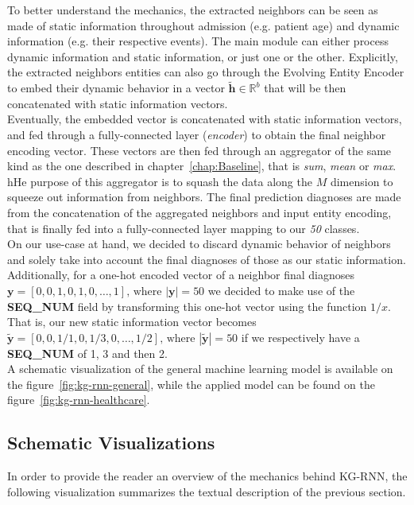 To better understand the mechanics, the extracted neighbors can be seen as made of static information throughout admission (e.g. patient age) and dynamic information (e.g. their respective events). The main module can either process dynamic information and static information, or just one or the other. Explicitly, the extracted neighbors entities can also go through the Evolving Entity Encoder to embed their dynamic behavior in a vector $\bm{\tilde{h}} \in \mathbb{R}^{b}$ that will be then concatenated with static information vectors. \\

Eventually, the embedded vector is concatenated with static information vectors, and fed through a fully-connected layer (\textit{encoder}) to obtain the final neighbor encoding vector. These vectors are then fed through an aggregator of the same kind as the one described in chapter~\ref{chap:Baseline}, that is \textit{sum}, \textit{mean} or \textit{max}. hHe purpose of this aggregator is to squash the data along the $M$ dimension to squeeze out information from neighbors. The final prediction diagnoses are made from the concatenation of the aggregated neighbors and input entity encoding, that is finally fed into a fully-connected layer mapping to our \emph{50} classes. \\

On our use-case at hand, we decided to discard dynamic behavior of neighbors and solely take into account the final diagnoses of those as our static information. Additionally, for a one-hot encoded vector of a neighbor final diagnoses $\bm{y}=[0, 0, 1, 0, 1, 0, \dots, 1]\mbox{, where }|\bm{y}|=50$ we decided to make use of the \textbf{SEQ\_NUM} field by transforming this one-hot vector using the function $1/x$. That is, our new static information vector becomes $\bm{\tilde{y}}=[0, 0, 1/1, 0, 1/3, 0, \dots, 1/2]\mbox{, where }|\bm{\tilde{y}}|=50$ if we respectively have a \textbf{SEQ\_NUM} of 1, 3 and then 2. \\

A schematic visualization of the general machine learning model is available on the figure~\ref{fig:kg-rnn-general}, while the applied model can be found on the figure~\ref{fig:kg-rnn-healthcare}.

\newpage
\subsection{Schematic Visualizations}
In order to provide the reader an overview of the mechanics behind KG-RNN, the following visualization summarizes the textual description of the previous section.

